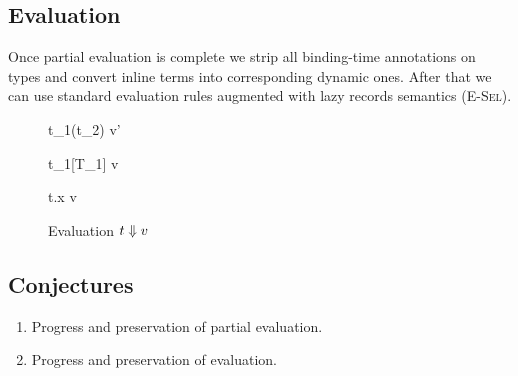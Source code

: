 \subsection{Evaluation}

Once partial evaluation is complete we strip all binding-time annotations on types
and convert inline terms into corresponding dynamic ones. After that we can use
standard \fsub evaluation rules augmented with lazy records semantics (\textsc{E-Sel}).

\begin{figure}[H]

  {t_1(t_2) \e v'}

  {t_1[T_1] \e v}

  {t.x \e v}
\caption{Evaluation $t \Downarrow v$}
\end{figure}

\subsection{Conjectures}

\begin{enumerate}
  \item Progress and preservation of partial evaluation.
  \item Progress and preservation of evaluation.
\end{enumerate}
